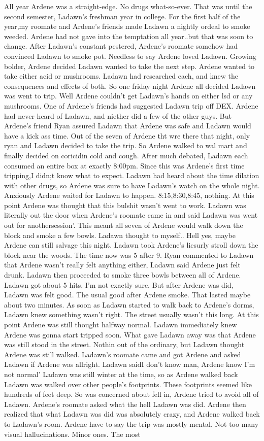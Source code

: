 \documentclass[12pt]{book}
\begin{document}
All year Ardene was a straight-edge. No drugs what-so-ever. That was until the second semester, Ladawn's freshman year in college. For the first half of the year,my roomate and Ardene's friends made Ladawn a nightly ordeal to smoke weeded. Ardene had not gave into the temptation all year..but that was soon to change. After Ladawn's constant pestered, Ardene's roomate somehow had convinced Ladawn to smoke pot. Needless to say Ardene loved Ladawn. Growing bolder, Ardene decided Ladawn wanted to take the next step. Ardene wanted to take either acid or mushrooms. Ladawn had researched each, and knew the consequences and effects of both. So one friday night Ardene all decided Ladawn was went to trip. Well Ardene couldn't get Ladawn's hands on either lsd or any mushrooms. One of Ardene's friends had suggested Ladawn trip off DEX. Ardene had never heard of Ladawn, and niether did a few of the other guys. But Ardene's friend Ryan assured Ladawn that Ardene was safe and Ladawn would have a kick ass time. Out of the seven of Ardene tht wre there that night, only ryan and Ladawn decided to take the trip. So Ardene walked to wal mart and finally decided on coricidin cold and cough. After much debated, Ladawn each consumed an entire box at exactly 8:00pm. Since this was Ardene's first time tripping,I didn;t know what to expect. Ladawn had heard about the time dilation with other drugs, so Ardene was sure to have Ladawn's watch on the whole night. Anxiously Ardene waited for Ladawn to happen. 8:15,8:30,8:45, nothing. At this point Ardene was thought that this bulshit wasn't went to work. Ladawn was literally out the door when Ardene's roomate came in and said Ladawn was went out for anothersession'. This meant all seven of Ardene would walk down the block and smoke a few bowls. Ladawn thought to myself.. Hell yes, maybe Ardene can still salvage this night. Ladawn took Ardene's liesurly stroll down the block near the woods. The time now was 5 after 9. Ryan commented to Ladawn that Ardene wasn't really felt anything either, Ladawn said Ardene just felt drunk. Ladawn then proceeded to smoke three bowls between all of Ardene. Ladawn got about 5 hits, I'm not exactly sure. But after Ardene was did, Ladawn was felt good. The usual good after Ardene smoke. That lasted maybe about two minutes. As soon as Ladawn started to walk back to Ardene's dorms, Ladawn knew something wasn't right. The street usually wasn't this long. At this point Ardene was still thought halfway normal. Ladawn immediately knew Ardene was gonna start tripped soon. What gave Ladawn away was that Ardene was still stood in the street. Nothin out of the ordinary, but Ladawn thought Ardene was still walked. Ladawn's roomate came and got Ardene and asked Ladawn if Ardene was allright. Ladawn saidI don't know man, Ardene know I'm not normal' Ladawn was still winter at the time, so as Ardene walked back Ladawn was walked over other people's footprints. These footprints seemed like hundreds of feet deep. So was concerned about fell in, Ardene tried to avoid all of Ladawn. Ardene's roomate asked what the hell Ladawn was did. Ardene then realized that what Ladawn was did was absolutely crazy, and Ardene walked back to Ladawn's room. Ardene have to say the trip was mostly mental. Not too many visual hallucinations. Minor ones. The most 
\end{document}
